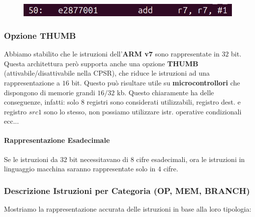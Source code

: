 \documentclass{article}
\begin{document}
\begin{figure}[htbp]
        \center
        \includegraphics[scale=0.3]{img/istrMacchina.png}
    \end{figure}

\subsubsection{Opzione THUMB}

Abbiamo stabilito che le istruzioni dell'\textbf{ARM v7} sono rappresentate in $32$ bit. Questa architettura però supporta anche una opzione \textbf{THUMB} (attivabile/disattivabile nella CPSR), che riduce le istruzioni ad una rappresentazione a $16$ bit. Questo può risultare utile su \textbf{microcontrollori} che dispongono di memorie grandi $16/32$ kb. Questo chiaramente ha delle conseguenze, infatti: solo $8$ registri sono considerati utilizzabili, registro dest. e registro $src1$ sono lo stesso, non possiamo utilizzare istr. operative condizionali ecc...

\paragraph{Rappresentazione Esadecimale} Se le istruzioni da $32$ bit necessitavano di $8$ cifre esadecimali, ora le istruzioni in linguaggio macchina saranno rappresentate solo in $4$ cifre.



\newpage

\subsubsection{Descrizione Istruzioni per Categoria (OP, MEM, BRANCH)}

Mostriamo la rappresentazione accurata delle istruzioni in base alla loro tipologia:
\end{document}
